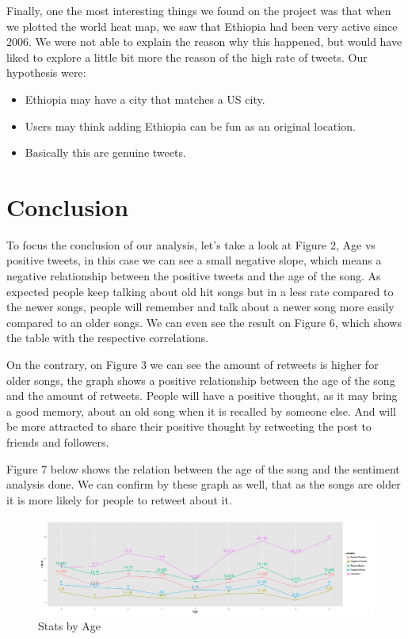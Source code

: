 \documentclass{article}
\begin{document}
\begin{itemize}
Finally, one the most interesting things we found on the project was that when we plotted the world heat map, we saw that Ethiopia had been very active since 2006. We were not able to explain the reason why this happened, but would have liked to explore a little bit more the reason of the high rate of tweets.  Our hypothesis were:
\begin{itemize} 
\item Ethiopia may have a city that matches a US city.
\item Users may think adding Ethiopia can be fun as an original location.
\item Basically this are genuine tweets.  
\end{itemize}
\end{itemize}
\pagebreak


\section{Conclusion}

To focus the conclusion of our analysis, let's take a look at Figure 2, Age vs positive tweets, in this case we can see a small negative slope, which means a negative relationship between the positive tweets and the age of the song.  As expected people keep talking about old hit songs but in a less rate compared to the newer songs, people will remember and talk about a newer song more easily compared to an older songs.  We can even see the result on Figure 6, which shows the table with the respective correlations.

On the contrary, on Figure 3 we can see the amount of retweets is higher for older songs, the graph shows a positive relationship between the age of the song and the amount of retweets. People will have a positive thought, as it may bring a good memory, about an old song when it is recalled by someone else. And will be more attracted to share their positive thought by retweeting the post to friends and followers.

Figure 7 below shows the relation between the age of the song and the sentiment analysis done. We can confirm by these graph as well, that as the songs are older it is more likely for people to retweet about it.
\begin{figure}[H]
  \centering
  \includegraphics[scale=0.3]{Stats_by_Age.png}
  \caption{Stats by Age}
\end{figure}
\end{document}
